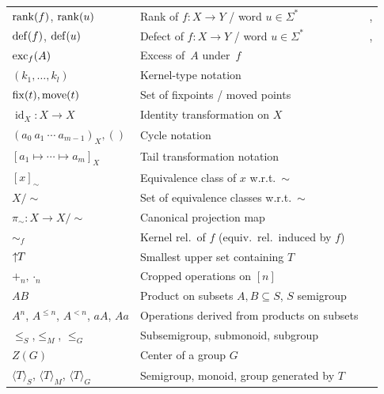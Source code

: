 \begin{longtable}{p{} p{} p{}}
	$\operatorname{rank}(f)$, $\operatorname{rank}(u)$ & Rank of $f \colon X\to Y$ / word $u \in \Sigma^*$ & \pageref{def:rank}, \pageref{def:rankword} \\
	$\operatorname{def}(f)$, $\operatorname{def}(u)$ & Defect of $f \colon X \to Y$ / word $u \in \Sigma^*$ & \pageref{def:defect}, \pageref{def:defectword} \\
	$\operatorname{exc}_{f}(A)$ & Excess of~$A$ under~$f$ & \pageref{def:excess} \\
	$(k_1, \ldots, k_l)$ & Kernel-type notation & \pageref{def:kernel-type} \\
	$\operatorname{fix}(t), \operatorname{move}(t)$ & Set of fixpoints / moved points & \pageref{def:fixmove} \\  
	$\operatorname{id}_X \colon X \to X$  & Identity transformation on $X$ & \pageref{def:identity_transformation} \\
	$(a_0 ~ a_1 ~ \cdots ~ a_{m-1})_X,  ()$ & Cycle notation & \pageref{def:cycle-notation} \\
	$[a_1 \mapsto \cdots \mapsto a_m]_X$ & Tail transformation notation & \pageref{def:SI-mapping} \\
	$[x]_{\sim}$ & Equivalence class of $x$ w.r.t.~$\sim$ & \pageref{def:equivalenceclasses} \\
	$X / {\sim}$ & Set of equivalence classes w.r.t.~$\sim$ & \pageref{def:eqfactor} \\
	$\pi_{\sim} \colon X \to X / {\sim}$ & Canonical projection map & \pageref{def:canprojmap} \\
	$\sim_f$     & Kernel rel.~of $f$ (equiv.~rel.~induced by $f$) & \pageref{def:kernel} \\
	$\mbox{\ensuremath{\displaystyle \uparrow \!\!T}}$           & Smallest upper set containing $T$ & \pageref{def:genupperset} \\		
	$+_n, \cdot_n$ & Cropped operations on $[n]$ & \pageref{def:plusmaln} \\
	$AB$ & Product on subsets $A,B \subseteq S$, $S$ semigroup & \pageref{def:product_subsets} \\
	$A^n$, $A^{\le n}$, $A^{< n}$, $aA$, $Aa$ & Operations derived from products on subsets & \pageref{def:powers-smaller} \\	
	$\le_S$,$\le_M$, $\le_G$ & Subsemigroup, submonoid, subgroup & \pageref{def:subsemigroup} \\ %
		$Z(G)$ & Center of a group $G$ & \pageref{def:center} \\	
	$\langle T \rangle_S$, $\langle T \rangle_M$, $\langle T \rangle_G$ & Semigroup, monoid, group generated by $T$ & \pageref{def:gensubstructures} \\

\end{longtable}
